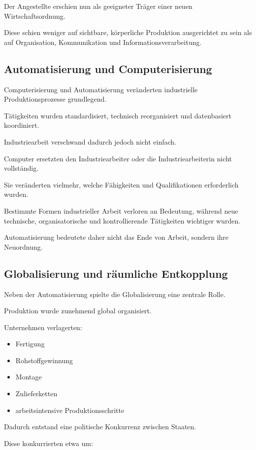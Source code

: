 Der Angestellte erschien nun
als geeigneter Träger
einer neuen Wirtschaftsordnung.

Diese schien weniger auf sichtbare,
körperliche Produktion ausgerichtet zu sein
als auf Organisation,
Kommunikation
und Informationsverarbeitung.

\subsection{Automatisierung und Computerisierung}

Computerisierung und Automatisierung
veränderten industrielle Produktionsprozesse
grundlegend.

Tätigkeiten wurden standardisiert,
technisch reorganisiert
und datenbasiert koordiniert.

Industriearbeit verschwand dadurch jedoch nicht einfach.

Computer ersetzten den Industriearbeiter
oder die Industriearbeiterin nicht vollständig.

Sie veränderten vielmehr,
welche Fähigkeiten
und Qualifikationen
erforderlich wurden.

Bestimmte Formen industrieller Arbeit
verloren an Bedeutung,
während neue technische,
organisatorische
und kontrollierende Tätigkeiten wichtiger wurden.

Automatisierung bedeutete daher
nicht das Ende von Arbeit,
sondern ihre Neuordnung.

\subsection{Globalisierung und räumliche Entkopplung}

Neben der Automatisierung spielte
die Globalisierung eine zentrale Rolle.

Produktion wurde zunehmend global organisiert.

Unternehmen verlagerten:

\begin{itemize}
\item Fertigung
\item Rohstoffgewinnung
\item Montage
\item Zulieferketten
\item arbeitsintensive Produktionsschritte
\end{itemize}

Dadurch entstand eine politische Konkurrenz
zwischen Staaten.

Diese konkurrierten etwa um:

